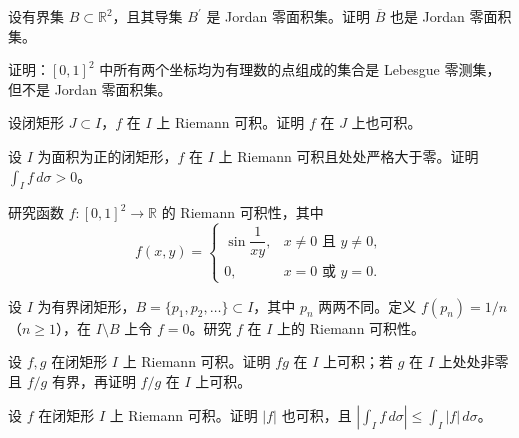 \noindent\begin{minipage}{\textwidth}
设有界集 $B\subset\mathbb R^2$，且其导集 $B^{\prime}$ 是 Jordan 零面积集。证明 $\overline B$ 也是 Jordan 零面积集。
\end{minipage}\par\vfill
\newpage
\noindent\begin{minipage}{\textwidth}
证明：$[0,1]^2$ 中所有两个坐标均为有理数的点组成的集合是 Lebesgue 零测集，但不是 Jordan 零面积集。
\end{minipage}\par\vfill
\noindent\begin{minipage}{\textwidth}
设闭矩形 $J\subset I$，$f$ 在 $I$ 上 Riemann 可积。证明 $f$ 在 $J$ 上也可积。
\end{minipage}\par\vfill
\noindent\begin{minipage}{\textwidth}
设 $I$ 为面积为正的闭矩形，$f$ 在 $I$ 上 Riemann 可积且处处严格大于零。证明 $\int_I f\,d\sigma>0$。
\end{minipage}\par\vfill
\newpage
\noindent\begin{minipage}{\textwidth}
研究函数 $f:[0,1]^2\to\mathbb R$ 的 Riemann 可积性，其中\[f(x,y)=\begin{cases}\sin\dfrac1{xy},&x\ne0\text{ 且 }y\ne0,\\0,&x=0\text{ 或 }y=0.\end{cases}\]
\end{minipage}\par\vfill
\noindent\begin{minipage}{\textwidth}
设 $I$ 为有界闭矩形，$B=\{p_1,p_2,\ldots\}\subset I$，其中 $p_n$ 两两不同。定义 $f(p_n)=1/n$（$n\ge1$），在 $I\setminus B$ 上令 $f=0$。研究 $f$ 在 $I$ 上的 Riemann 可积性。
\end{minipage}\par\vfill
\noindent\begin{minipage}{\textwidth}
设 $f,g$ 在闭矩形 $I$ 上 Riemann 可积。证明 $fg$ 在 $I$ 上可积；若 $g$ 在 $I$ 上处处非零且 $f/g$ 有界，再证明 $f/g$ 在 $I$ 上可积。
\end{minipage}\par\vfill
\newpage
\noindent\begin{minipage}{\textwidth}
设 $f$ 在闭矩形 $I$ 上 Riemann 可积。证明 $|f|$ 也可积，且 $\left|\int_I f\,d\sigma\right|\le\int_I|f|\,d\sigma$。
\end{minipage}\par\vfill
